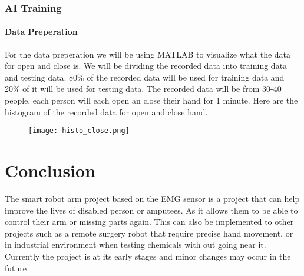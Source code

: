 \documentclass[12pt]{article}
\begin{document}
    \subsubsection{AI Training}
    \paragraph{Data Preperation}
        \begin{flushleft}
            For the data preperation we will be using MATLAB to visualize what the data for open and close is.
            We will be dividing the recorded data into training data and testing data. 80\% of the recorded data will be 
            used for training data and 20\% of it will be used for testing data.
            The recorded data will be from 30-40 people, each person will each open an close their hand for 1 minute.
            Here are the histogram of the recorded data for open and close hand.
                \begin{figure}[!htbp]
                    \texttt{[image: histo\_close.png]}
                \end{figure}
        \end{flushleft}
    \section{Conclusion}
    \begin{flushleft}
    The smart robot arm project based on the EMG sensor is a project that can help improve the lives of disabled person or amputees. As it allows them
    to be able to control their arm or missing parts again. This can also be implemented to other projects such as a remote surgery robot that require precise hand movement,
    or in industrial environment when testing chemicals with out going near it. Currently the project is at its early stages and minor changes may occur in the future
    
    \end{flushleft}
    \break
    
    
    
\end{document}
